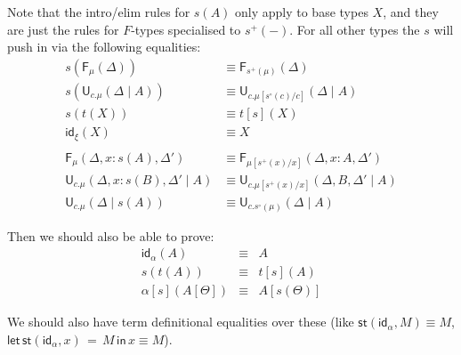 \documentclass[10pt]{article}
\newcommand{\yields}{\vdash}
\newcommand{\type}{\,\,\mathsf{type}}
\newcommand\F[2]{\ensuremath{\mathsf{F}_{#1}(#2)}}
\newcommand\U[3]{\ensuremath{\mathsf{U}_{#1}(#2 \mid #3)}}
\newcommand\St[2]{\ensuremath{{#1}(#2)}}
\newcommand\StI[2]{\ensuremath{\mathsf{st}(#1,#2)}}
\newcommand\StE[4]{\ensuremath{\mathsf{let} \, \StI{#2}{#3} \, = \, {#1} \, \mathsf{in} \, #4}}
\newcommand\TrPlus[2]{\ensuremath{#1^+(#2)}}
\newcommand\TrCirc[2]{\ensuremath{#1^\circ(#2)}}
\newcommand{\id}{\mathsf{id}}
\begin{document}
Note that the intro/elim rules for \St{s}{A} only apply to base types $X$, and they are just the rules for $F$-types specialised to $\TrPlus{s}{-}$. For all other types the $s$ will push in via the following equalities:
\begin{align*}
\St{s}{\F{\mu}{\Delta}} &\equiv \F{\TrPlus{s}{\mu}}{\Delta} \\
\St{s}{\U{c.\mu}{\Delta}{A}} &\equiv \U{c.\mu[\TrCirc{s}{c}/c]}{\Delta}{A} \\
\St{s}{\St{t}{X}} &\equiv \St{t[s]}{X} \\
\St{\id_\xi}{X} &\equiv X \\
~\\
\F{\mu}{\Delta, x : \St{s}{A}, \Delta'} &\equiv \F{\mu[\TrPlus{s}{x} / x]}{\Delta, x : A, \Delta'} \\
\U{c.\mu}{\Delta, x : \St{s}{B}, \Delta'}{A} &\equiv \U{c.\mu[\TrPlus{s}{x}/x]}{\Delta, B, \Delta'}{A} \\
\U{c.\mu}{\Delta}{\St{s}{A}} &\equiv \U{c.\TrCirc{s}{\mu}}{\Delta}{A}
\end{align*}

Then we should also be able to prove:
\[
\begin{array}{rcl}
\St{\id_\alpha}{A} & \equiv & A \\
\St{s}{\St{t}{A}} &\equiv & \St{t[s]}{A} \\
\St{\alpha[s]}{A[\Theta]} & \equiv & A[\St{s}{\Theta}]
\end{array}
\]

We should also have term definitional equalities over these (like
$\StI{\id_\alpha}{M} \equiv M$, $\StE{M}{\id_\alpha}{x}{x} \equiv M$).
%
\end{document}
